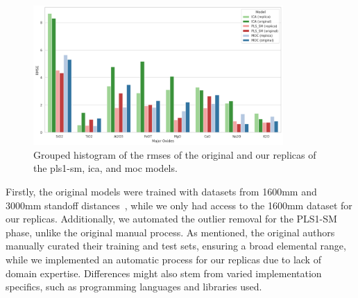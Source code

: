 \begin{figure}
	\centering
	\includegraphics[width=0.85\textwidth]{images/rmse_historgram.png}
	\caption{Grouped histogram of the \gls{rmse}s of the original and our replicas of the \gls{pls1-sm}, \gls{ica}, and \gls{moc} models.}
	\label{fig:rmse_histograms}
\end{figure}

Firstly, the original models were trained with datasets from 1600mm and 3000mm standoff distances~\cite{cleggRecalibrationMarsScience2017}, while we only had access to the 1600mm dataset for our replicas.
Additionally, we automated the outlier removal for the PLS1-SM phase, unlike the original manual process.
As mentioned, the original authors manually curated their training and test sets, ensuring a broad elemental range, while we implemented an automatic process for our replicas due to lack of domain expertise.
Differences might also stem from varied implementation specifics, such as programming languages and libraries used.

